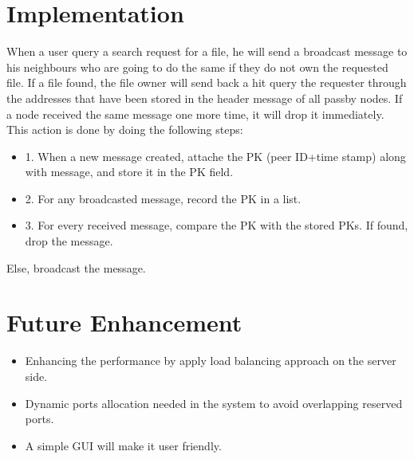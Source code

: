 \documentclass{article}
\begin{document}
\section{Implementation}
When a user query a search request for a file, he will send a broadcast message to his neighbours who are going to do the same if they do not own the requested file.
If a file found, the file owner will send back a hit query the requester through the addresses that have been stored in the header message of all passby nodes.
If a node received the same message one more time, it will drop it immediately. This action is done by doing the following steps:
\begin{itemize}
\item 1. When a new message created, attache the PK (peer ID+time stamp) along with message, and store it in the PK field.
\item 2. For any broadcasted message, record the PK in a list.
\item 3. For every received message, compare the PK with the stored PKs. If found, drop the message.
\end{itemize}

Else, broadcast the message.


\section{Future Enhancement}
\begin{itemize}
\item Enhancing the performance by apply load balancing approach on the server side.
\item Dynamic ports allocation needed in the system to avoid overlapping reserved
ports.
\item A simple GUI will make it user friendly.

\end{itemize}
\end{document}
